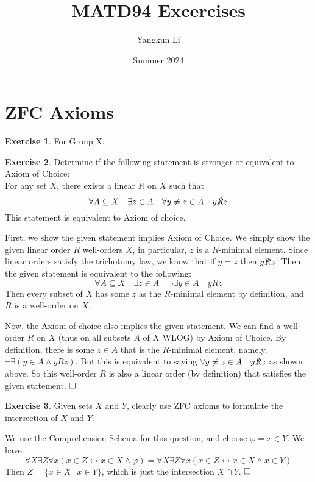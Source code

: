 \documentclass{article}
\title{MATD94 Excercises}
\author{Yangkun Li}
\date{Summer 2024}
\theoremstyle{definition}
\newtheorem{exercise}{Exercise}[section]
\newcommand{\so}{\text{\textbf{Solution: }}}
\newcommand{\es}{$\hfill \square$}
\begin{document}
\maketitle

\section{ZFC Axioms}
    \begin{exercise}
        \so For Group X.
    \end{exercise}

    \begin{exercise}
        Determine if the following statement is stronger or equivalent to Axiom of Choice:\\
        For any set $X$, there exists a linear $R$ on $X$ such that 
        $$\forall A \subseteq X \quad \exists z \in A \quad \forall y \neq z \in A \quad y\slashed{R}z$$
        \so This statement is equivalent to Axiom of choice. 
        
        First, we show the given statement implies Axiom of Choice. We simply show the given linear order $R$ well-orders $X$, in particular, $z$ is a $R$-minimal element. Since linear orders satisfy the trichotomy law, we know that if $y = z$ then $y \slashed{R} z$.  Then the given statement is equivalent to the following:
        $$\forall A \subseteq X \quad \exists z \in A \quad \neg\exists y \in A \quad yRz$$
        Then every subset of $X$ has some $z$ as the $R$-minimal element by definition, and $R$ is a well-order on $X$.

        Now, the Axiom of choice also implies the given statement. We can find a well-order $R$ on $X$ (thus on all subsets $A$ of $X$ WLOG) by Axiom of Choice. By definition, there is some $z\in A$ that is the $R$-minimal element, namely, $\neg\exists (y \in A \land yRz)$. But this is equivalent to saying $\forall y \neq z \in A \quad y\slashed{R}z$ as shown above. So this well-order $R$ is also a linear order (by definition) that satisfies the given statement. \es
    \end{exercise}
    \begin{exercise}
        Given sets $X$ and $Y$, clearly use ZFC axioms to formulate the intersection of $X$ and $Y$.
        
        \noindent\so We use the Comprehension Schema for this question, and choose $\varphi = x \in Y$. We have 
        $$\forall X \exists Z\forall x(x \in Z \leftrightarrow x \in X \land \varphi) = \forall X \exists Z\forall x(x \in Z \leftrightarrow x \in X \land x \in Y)$$
        Then $Z = \{x \in X \ |\ x \in Y\}$, which is just the intersection $X \cap Y$. \es
    \end{exercise}
\end{document}
